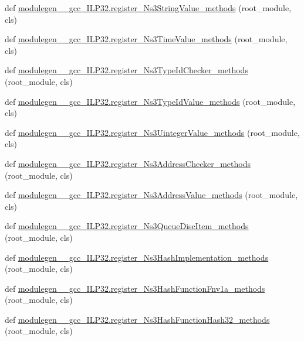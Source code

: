 \begin{DoxyCompactItemize}
\item 
def \hyperlink{namespacemodulegen____gcc__ILP32_ac8c4651dc0b918912214332282c9937c}{modulegen\+\_\+\+\_\+gcc\+\_\+\+I\+L\+P32.\+register\+\_\+\+Ns3\+String\+Value\+\_\+methods} (root\+\_\+module, cls)
\item 
def \hyperlink{namespacemodulegen____gcc__ILP32_a1105d61b4c389df61b8b83b0a25cc654}{modulegen\+\_\+\+\_\+gcc\+\_\+\+I\+L\+P32.\+register\+\_\+\+Ns3\+Time\+Value\+\_\+methods} (root\+\_\+module, cls)
\item 
def \hyperlink{namespacemodulegen____gcc__ILP32_a8cc76f23a8cb33ad3a0e4d77e8fbee0a}{modulegen\+\_\+\+\_\+gcc\+\_\+\+I\+L\+P32.\+register\+\_\+\+Ns3\+Type\+Id\+Checker\+\_\+methods} (root\+\_\+module, cls)
\item 
def \hyperlink{namespacemodulegen____gcc__ILP32_a39c112d1c935b295e15786cb622c73a5}{modulegen\+\_\+\+\_\+gcc\+\_\+\+I\+L\+P32.\+register\+\_\+\+Ns3\+Type\+Id\+Value\+\_\+methods} (root\+\_\+module, cls)
\item 
def \hyperlink{namespacemodulegen____gcc__ILP32_ac714dce8d474460352595c8579b4b110}{modulegen\+\_\+\+\_\+gcc\+\_\+\+I\+L\+P32.\+register\+\_\+\+Ns3\+Uinteger\+Value\+\_\+methods} (root\+\_\+module, cls)
\item 
def \hyperlink{namespacemodulegen____gcc__ILP32_a6cddc7786a1240bac0c2c11d2e5e40f3}{modulegen\+\_\+\+\_\+gcc\+\_\+\+I\+L\+P32.\+register\+\_\+\+Ns3\+Address\+Checker\+\_\+methods} (root\+\_\+module, cls)
\item 
def \hyperlink{namespacemodulegen____gcc__ILP32_a73078c37ac27c6fd2ec5e6a012ec4c0d}{modulegen\+\_\+\+\_\+gcc\+\_\+\+I\+L\+P32.\+register\+\_\+\+Ns3\+Address\+Value\+\_\+methods} (root\+\_\+module, cls)
\item 
def \hyperlink{namespacemodulegen____gcc__ILP32_ab297102e5a31af0465d81bcfcabc6201}{modulegen\+\_\+\+\_\+gcc\+\_\+\+I\+L\+P32.\+register\+\_\+\+Ns3\+Queue\+Disc\+Item\+\_\+methods} (root\+\_\+module, cls)
\item 
def \hyperlink{namespacemodulegen____gcc__ILP32_acbacaf626a5a437cc46ab734cfde3cb8}{modulegen\+\_\+\+\_\+gcc\+\_\+\+I\+L\+P32.\+register\+\_\+\+Ns3\+Hash\+Implementation\+\_\+methods} (root\+\_\+module, cls)
\item 
def \hyperlink{namespacemodulegen____gcc__ILP32_a8a8387218e2c3d882054e6b56a6a4b07}{modulegen\+\_\+\+\_\+gcc\+\_\+\+I\+L\+P32.\+register\+\_\+\+Ns3\+Hash\+Function\+Fnv1a\+\_\+methods} (root\+\_\+module, cls)
\item 
def \hyperlink{namespacemodulegen____gcc__ILP32_afac315fff05eebcf56ca0655484fb790}{modulegen\+\_\+\+\_\+gcc\+\_\+\+I\+L\+P32.\+register\+\_\+\+Ns3\+Hash\+Function\+Hash32\+\_\+methods} (root\+\_\+module, cls)

\end{DoxyCompactItemize}
